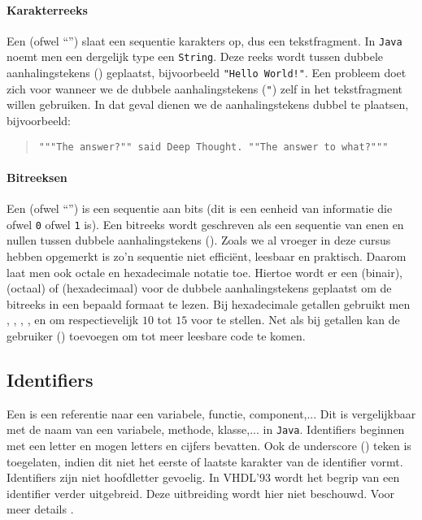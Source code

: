\paragraph{Karakterreeks}
Een  (ofwel ``'') slaat een sequentie karakters op, dus een tekstfragment. In \texttt{Java} noemt men een dergelijk type een \texttt{String}. Deze reeks wordt tussen dubbele aanhalingstekens () geplaatst, bijvoorbeeld \texttt{"Hello World!"}. Een probleem doet zich voor wanneer we de dubbele aanhalingstekens (\texttt{"}) zelf in het tekstfragment willen gebruiken. In dat geval dienen we de aanhalingstekens dubbel te plaatsen, bijvoorbeeld:
\begin{quote}\verb+"""The answer?"" said Deep Thought. ""The answer to what?"""+\cite[\S25]{Adams81BOOK54}\end{quote}
\paragraph{Bitreeksen}
Een  (ofwel ``'') is een sequentie aan bits (dit is een eenheid van informatie die ofwel \texttt{0} ofwel \texttt{1} is). Een bitreeks wordt geschreven als een sequentie van enen en nullen tussen dubbele aanhalingstekens (). Zoals we al vroeger in deze cursus hebben opgemerkt is zo'n sequentie niet effici\"ent, leesbaar en praktisch. Daarom laat men ook octale  en hexadecimale notatie toe. Hiertoe wordt er een  (binair),  (octaal) of  (hexadecimaal) voor de dubbele aanhalingstekens geplaatst om de bitreeks in een bepaald formaat te lezen. Bij hexadecimale getallen gebruikt men , , , ,  en  om respectievelijk $10$ tot $15$ voor te stellen. Net als bij getallen kan de gebruiker  (\vhdltermen{\_}) toevoegen om tot meer leesbare code te komen.
\subsection{Identifiers}
Een  is een referentie naar een variabele, functie, component,... Dit is vergelijkbaar met de naam van een variabele, methode, klasse,... in \texttt{Java}. Identifiers beginnen met een letter en mogen letters en cijfers bevatten. Ook de underscore (\vhdltermen{\_}) teken is toegelaten, indien dit niet het eerste of laatste karakter van de identifier vormt. Identifiers zijn niet hoofdletter gevoelig. In VHDL'93 wordt het begrip van een identifier verder uitgebreid. Deze uitbreiding wordt hier niet beschouwd. Voor meer details \cite[p. 4]{hardi00}.
